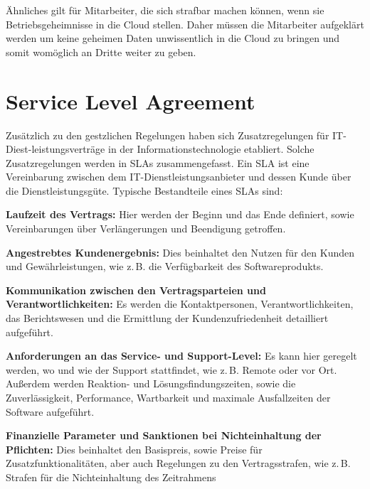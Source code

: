 \"Ahnliches gilt f\"ur Mitarbeiter, die sich strafbar machen k\"onnen, wenn sie Betriebsgeheimnisse in die Cloud stellen. Daher m\"ussen die Mitarbeiter aufgekl\"art werden um keine geheimen Daten unwissentlich in die Cloud zu bringen und somit wom\"oglich an Dritte weiter zu geben.

\section{Service Level Agreement}
Zus\"atzlich zu den gestzlichen Regelungen haben sich  Zusatzregelungen  f\"ur IT-Diest-leistungsvertr\"age in der Informationstechnologie etabliert. Solche Zusatzregelungen werden in SLAs zusammengefasst.
Ein SLA ist eine Vereinbarung zwischen dem IT-Dienstleistungsanbieter und dessen Kunde \"uber die Dienstleistungsg\"ute.\newline
Typische Bestandteile eines SLAs sind:
\begin{seList}
\item \textbf{Laufzeit des Vertrags:}\newline
Hier werden der Beginn und das Ende definiert, sowie Vereinbarungen \"uber Verl\"angerungen und Beendigung getroffen.
\item \textbf{Angestrebtes Kundenergebnis:}\newline
Dies beinhaltet den Nutzen f\"ur den Kunden und Gew\"ahrleistungen, wie z.\,B. die Verf\"ugbarkeit des Softwareprodukts.
\item \textbf{Kommunikation zwischen den Vertragsparteien und Verantwortlichkeiten:}\newline	
Es werden die Kontaktpersonen, Verantwortlichkeiten, das Berichtswesen und die Ermittlung der Kundenzufriedenheit detailliert aufgef\"uhrt.
\item \textbf{Anforderungen an das Service- und Support-Level:}\newline	
Es kann hier geregelt werden, wo und wie der Support stattfindet, wie z.\,B. Remote oder vor Ort. Au{\ss}erdem werden Reaktion- und L\"osungsfindungszeiten, sowie die Zuverl\"assigkeit, Performance, Wartbarkeit und maximale Ausfallzeiten der Software aufgef\"uhrt.
\item \textbf{Finanzielle Parameter und Sanktionen bei Nichteinhaltung der Pflichten:}\newline	
Dies beinhaltet den Basispreis, sowie Preise f\"ur Zusatzfunktionalit\"aten, aber auch Regelungen zu den Vertragsstrafen, wie z.\,B. Strafen f\"ur die Nichteinhaltung des Zeitrahmens
\end{seList}

